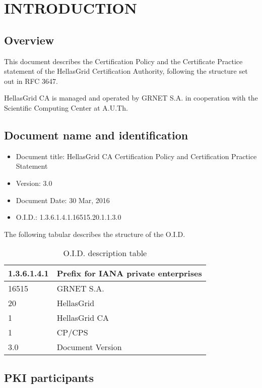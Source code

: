 
\chapter{INTRODUCTION}
\section{Overview}

This document describes the Certification Policy and the Certificate Practice statement of the HellasGrid Certification Authority, following the structure set out in RFC 3647. 

HellasGrid CA is managed and operated by GRNET S.A. in cooperation with the Scientific Computing Center at A.U.Th.

\section{Document name and identification}
\label{sec:DocumentNameAndIdentification}

\begin{itemize}
\item{Document title: HellasGrid CA Certification Policy and Certification Practice Statement}
\item{Version: $3.0$}
\item{Document Date: 30 Mar, 2016}
\item{O.I.D.: 1.3.6.1.4.1.16515.20.1.1.3.0}
\end{itemize}
The following tabular describes the structure of the O.I.D.

\begin{table}[hbt]
\begin{center}
\begin{tabular}{|l|l|}
\hline
1.3.6.1.4.1 & Prefix for IANA private enterprises \\
\hline
16515 & GRNET S.A. \\
\hline
20 & HellasGrid \\
\hline
1 & HellasGrid CA \\
\hline
1 & CP/CPS \\
\hline
3.0 & Document Version \\
\hline
\end{tabular}
\end{center}
\caption{O.I.D. description table}
\end{table}

\section{PKI participants}

